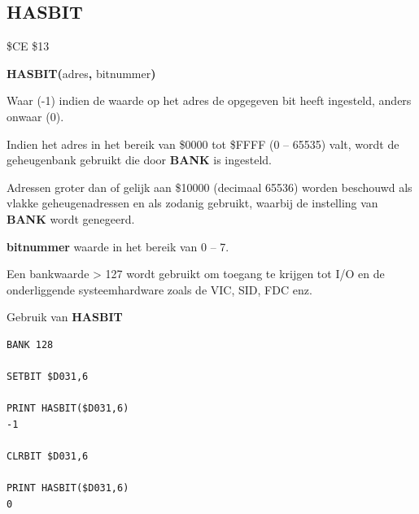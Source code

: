 \subsection{HASBIT}
\begin{description}[leftmargin=2cm,style=nextline]
\item [Token:]    \$CE \$13

\item [Formaat:]   {\bf HASBIT(}adres{\bf,} bitnummer{\bf)}

\item [Retourneert:]  Waar (-1) indien de waarde op het adres de opgegeven bit heeft ingesteld, anders onwaar (0).

Indien het adres in het bereik van \$0000 tot \$FFFF (0 -- 65535) valt, wordt de geheugenbank gebruikt die door {\bf BANK} is ingesteld.

                  Adressen groter dan of gelijk aan \$10000 (decimaal 65536) worden beschouwd als vlakke geheugenadressen en als zodanig gebruikt, waarbij de instelling van {\bf BANK} wordt genegeerd.

                  {\bf bitnummer} waarde in het bereik van 0 -- 7.

                  Een bankwaarde > 127 wordt gebruikt om toegang te krijgen tot I/O en de onderliggende systeemhardware zoals de VIC, SID, FDC enz.

\item [Voorbeelden:] Gebruik van {\bf HASBIT}

\begin{tcolorbox}[colback=black,coltext=white]
\verbatimfont{\codefont}
\begin{verbatim}
BANK 128

SETBIT $D031,6

PRINT HASBIT($D031,6)
-1

CLRBIT $D031,6

PRINT HASBIT($D031,6)
0
\end{verbatim}
\end{tcolorbox}
\end{description}


\newpage
